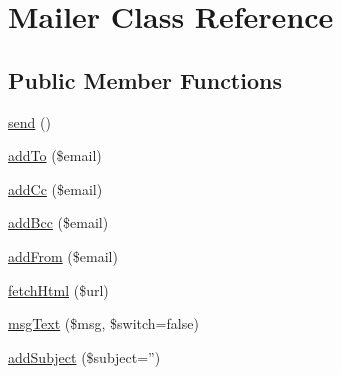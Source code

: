 \hypertarget{class_mailer}{\section{Mailer Class Reference}
\label{class_mailer}
}
\subsection*{Public Member Functions}
\begin{DoxyCompactItemize}
\item 
\hyperlink{class_mailer_a12bcef5130168b80d3d52dc82213f19a}{send} ()
\item 
\hyperlink{class_mailer_aacb4d359fe0baad6a39ebda1613f1b3a}{add\-To} (\$email)
\item 
\hyperlink{class_mailer_a36316da1ac12624e7817cbc65ba51726}{add\-Cc} (\$email)
\item 
\hyperlink{class_mailer_ac320ba7834972b0109bec4627f18122a}{add\-Bcc} (\$email)
\item 
\hyperlink{class_mailer_a94bb8db8b58c3919ef8fcf714c217d30}{add\-From} (\$email)
\item 
\hyperlink{class_mailer_a305e6eb17fe7d49383d9ddeb57ea54be}{fetch\-Html} (\$url)
\item 
\hyperlink{class_mailer_aa8ccfd30329dbb3cd1b5740173072c9e}{msg\-Text} (\$msg, \$switch=false)
\item 
\hyperlink{class_mailer_afca153730fe26e45a98e1540f20b69f2}{add\-Subject} (\$subject='')
\end{DoxyCompactItemize}


